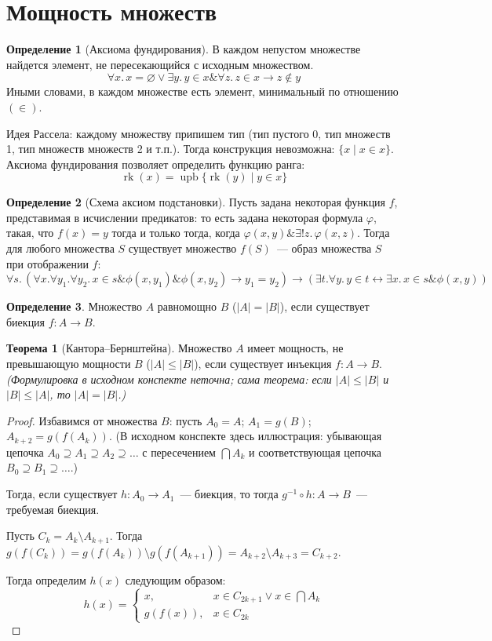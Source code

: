 \documentclass[a4paper,11pt]{article}
\theoremstyle{definition}
\newtheorem*{thm}{Теорема}
\newtheorem*{dfn}{Определение}
\newcommand{\amp}{\mathbin{\&}}
\newcommand{\upb}{\operatorname{upb}}
\newcommand{\rk}{\operatorname{rk}}
\begin{document}
\section{Мощность множеств}
\begin{dfn}[Аксиома фундирования]
В каждом непустом множестве найдется элемент, не пересекающийся с исходным
множеством.
\[ \forall x.\,x = \varnothing \vee \exists y.\,y \in x \amp \forall z.\,z \in x \to z \notin y \]
Иными словами, в каждом множестве есть элемент, минимальный по отношению
$(\in)$.
\end{dfn}
Идея Рассела: каждому множеству припишем тип (тип пустого 0, тип множеств 1, тип
множеств множеств 2 и т.п.). Тогда конструкция невозможна: $\{x \mid x \in x\}$.
Аксиома фундирования позволяет определить функцию ранга:
\[ \rk(x) = \upb\{\rk(y) \mid y \in x\} \]
\begin{dfn}[Схема аксиом подстановки]
Пусть задана некоторая функция $f$, представимая в исчислении предикатов: то
есть задана некоторая формула $\varphi$, такая, что $f(x) = y$ тогда и только
тогда, когда $\varphi(x, y) \amp \exists!z.\,\varphi(x, z)$. Тогда для любого
множества $S$ существует множество $f(S)$~--- образ множества $S$ при
отображении $f$:
\[
\forall s.\,(\forall x.\forall y_1.\forall y_2.\,x \in s \amp \phi(x, y_1) \amp \phi(x, y_2) \to y_1 = y_2) \to (\exists t.\forall y.\,y \in t \leftrightarrow \exists x.\,x \in s \amp \phi(x, y))
\]
\end{dfn}
\begin{dfn}
Множество $A$ равномощно $B$ ($|A| = |B|$), если существует биекция $f : A \to
B$.
\end{dfn}
\begin{thm}[Кантора--Бернштейна]
Множество $A$ имеет мощность, не превышающую мощности $B$ ($|A| \le |B|$),
если существует инъекция $f : A \to B$. \emph{(Формулировка в исходном конспекте
неточна; сама теорема: если $|A| \le |B|$ и $|B| \le |A|$, то $|A| = |B|$.)}
\end{thm}
\begin{proof}
Избавимся от множества $B$: пусть $A_0 = A$; $A_1 = g(B)$; $A_{k+2} =
g(f(A_k))$. (В исходном конспекте здесь иллюстрация: убывающая цепочка $A_0
\supseteq A_1 \supseteq A_2 \supseteq \dots$ с пересечением $\bigcap A_k$ и
соответствующая цепочка $B_0 \supseteq B_1 \supseteq \dots$.)

Тогда, если существует $h : A_0 \to A_1$~--- биекция, то тогда $g^{-1} \circ h :
A \to B$~--- требуемая биекция.

Пусть $C_k = A_k \setminus A_{k+1}$. Тогда $g(f(C_k)) = g(f(A_k)) \setminus
g(f(A_{k+1})) = A_{k+2} \setminus A_{k+3} = C_{k+2}$.

Тогда определим $h(x)$ следующим образом:
\[
h(x) =
\begin{cases}
x, & x \in C_{2k+1} \vee x \in \bigcap A_k\\
g(f(x)), & x \in C_{2k}
\end{cases}
\]
\end{proof}
\end{document}
